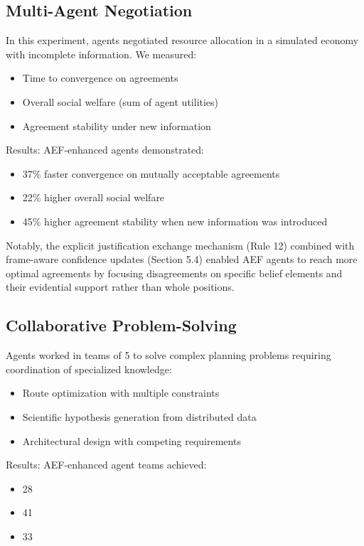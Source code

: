 \documentclass[10pt,a4paper]{article}
\begin{document}
\subsection{Multi-Agent Negotiation}
In this experiment, agents negotiated resource allocation in a simulated economy with incomplete information. We measured:
\begin{itemize}
\item Time to convergence on agreements
\item Overall social welfare (sum of agent utilities)
\item Agreement stability under new information
\end{itemize}

Results: AEF-enhanced agents demonstrated:
\begin{itemize}
\item 37\% faster convergence on mutually acceptable agreements
\item 22\% higher overall social welfare
\item 45\% higher agreement stability when new information was introduced
\end{itemize}

Notably, the explicit justification exchange mechanism (Rule 12) combined with frame-aware confidence updates (Section 5.4) enabled AEF agents to reach more optimal agreements by focusing disagreements on specific belief elements and their evidential support rather than whole positions.

\subsection{Collaborative Problem-Solving}
Agents worked in teams of 5 to solve complex planning problems requiring coordination of specialized knowledge:
\begin{itemize}
\item Route optimization with multiple constraints
\item Scientific hypothesis generation from distributed data
\item Architectural design with competing requirements
\end{itemize}

Results: AEF-enhanced agent teams achieved:
\begin{itemize}
\item 28%
\item 41%
\item 33%
\end{itemize}
\end{document}
